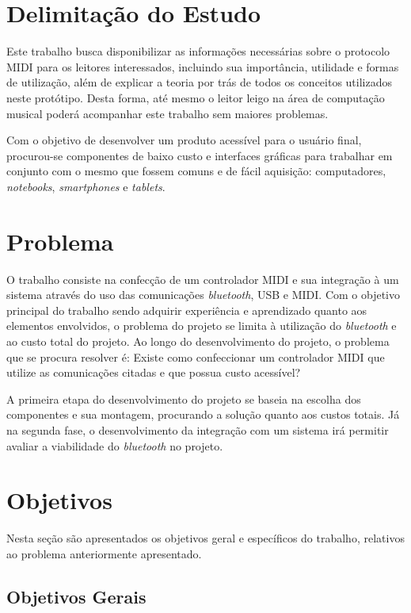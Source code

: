     \section{Delimitação do Estudo}

        Este trabalho busca disponibilizar as informações necessárias sobre o protocolo MIDI para os leitores interessados, incluindo sua importância, utilidade e formas de utilização, além de explicar a teoria por trás de todos os conceitos utilizados neste protótipo. Desta forma, até mesmo o leitor leigo na área de computação musical poderá acompanhar este trabalho sem maiores problemas.

        Com o objetivo de desenvolver um produto acessível para o usuário final, procurou-se componentes de baixo custo e interfaces gráficas para trabalhar em conjunto com o mesmo que fossem comuns e de fácil aquisição: computadores, \textit{notebooks}, \textit{smartphones} e \textit{tablets}.

    \section{Problema}

        O trabalho consiste na confecção de um controlador MIDI e sua integração à um sistema através do uso das comunicações \textit{bluetooth}, USB e MIDI. Com o objetivo principal do trabalho sendo adquirir experiência e aprendizado quanto aos elementos envolvidos, o problema do projeto se limita à utilização do \textit{bluetooth} e ao custo total do projeto. Ao longo do desenvolvimento do projeto, o problema que se procura resolver é: Existe como confeccionar um controlador MIDI que utilize as comunicações citadas e que possua custo acessível?

        A primeira etapa do desenvolvimento do projeto se baseia na escolha dos componentes e sua montagem, procurando a solução quanto aos custos totais. Já na segunda fase, o desenvolvimento da integração com um sistema irá permitir avaliar a viabilidade do \textit{bluetooth} no projeto.

    \section{Objetivos}

        Nesta seção são apresentados os objetivos geral e específicos do trabalho, relativos ao problema anteriormente apresentado.

        \subsection{Objetivos Gerais}

